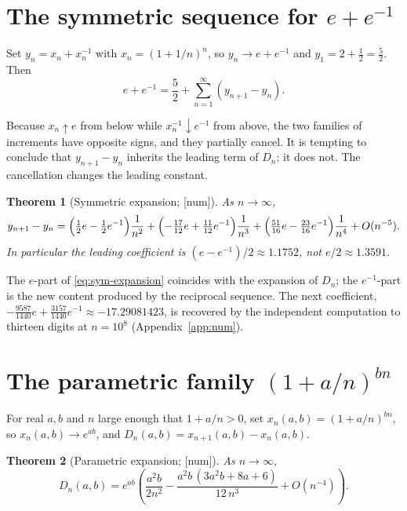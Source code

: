 \documentclass[11pt]{article}
\theoremstyle{plain}
\newtheorem{theorem}{Theorem}
\theoremstyle{remark}
\begin{document}
\section{The symmetric sequence for \texorpdfstring{$e+e^{-1}$}{e+1/e}}
\label{sec:sym}

Set $y_n = x_n + x_n^{-1}$ with $x_n = (1+1/n)^n$, so $y_n \to e + e^{-1}$ and
$y_1 = 2 + \tfrac12 = \tfrac52$. Then
\begin{equation}
  e + e^{-1} = \frac52 + \sum_{n=1}^{\infty}(y_{n+1}-y_n).
\end{equation}

Because $x_n\uparrow e$ from below while $x_n^{-1}\downarrow e^{-1}$ from above,
the two families of increments have opposite signs, and they partially cancel.
It is tempting to conclude that $y_{n+1}-y_n$ inherits the leading term of $D_n$;
it does not. The cancellation changes the leading constant.

\begin{theorem}[Symmetric expansion; \textsf{[num]}]
\label{thm:sym}
As $n\to\infty$,
\begin{equation}
  y_{n+1}-y_n
  = \Bigl(\tfrac12 e - \tfrac12 e^{-1}\Bigr)\frac1{n^{2}}
  + \Bigl(-\tfrac{17}{12} e + \tfrac{11}{12} e^{-1}\Bigr)\frac1{n^{3}}
  + \Bigl(\tfrac{51}{16} e - \tfrac{23}{16} e^{-1}\Bigr)\frac1{n^{4}}
  + O(n^{-5}).
  \label{eq:sym-expansion}
\end{equation}
In particular the leading coefficient is $(e-e^{-1})/2 \approx 1.1752$, not
$e/2 \approx 1.3591$.
\end{theorem}

The $e$-part of \eqref{eq:sym-expansion} coincides with the expansion of $D_n$;
the $e^{-1}$-part is the new content produced by the reciprocal sequence. The
next coefficient, $-\tfrac{9587}{1440}e + \tfrac{3157}{1440}e^{-1} \approx
-17.29081423$, is recovered by the independent computation to thirteen digits at
$n = 10^{8}$ (Appendix~\ref{app:num}).

\section{The parametric family \texorpdfstring{$(1+a/n)^{bn}$}{(1+a/n)\^{}(bn)}}
\label{sec:param}

For real $a,b$ and $n$ large enough that $1 + a/n > 0$, set
$x_n(a,b) = (1+a/n)^{bn}$, so $x_n(a,b)\to e^{ab}$, and
$D_n(a,b) = x_{n+1}(a,b) - x_n(a,b)$.

\begin{theorem}[Parametric expansion; \textsf{[num]}]
\label{thm:param}
As $n\to\infty$,
\begin{equation}
  D_n(a,b) = e^{ab}\left(\frac{a^{2}b}{2n^{2}}
    - \frac{a^{2}b\,(3a^{2}b + 8a + 6)}{12\,n^{3}} + O(n^{-4})\right).
  \label{eq:param-expansion}
\end{equation}
\end{theorem}
\end{document}
